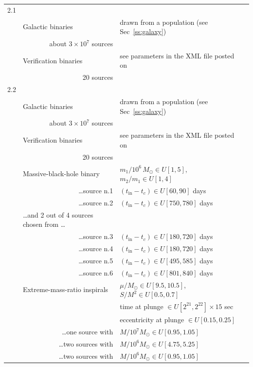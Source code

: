 \documentclass[12pt]{iopart}
\begin{document}
\begin{table}
\begin{tabular}{llll}
2.1 & & \\
&Galactic binaries & drawn from a population (see Sec~\ref{ss:galaxy})\\
&\multicolumn{1}{r}{about $3\times 10^7$ sources} & \\
&Verification binaries & see parameters in the XML file posted on~\cite{MLDCweb}\\
&\multicolumn{1}{r}{20 sources} \\
\hline
2.2 & & \\
&Galactic binaries & drawn from a population (see Sec~\ref{ss:galaxy})\\
&\multicolumn{1}{r}{about $3\times 10^7$ sources} \\
&Verification binaries & see parameters in the XML file posted on~\cite{MLDCweb} \\
&\multicolumn{1}{r}{20 sources} & \\
&Massive-black-hole binary & $m_1/10^6\,M_\odot \in U[1,5]$, $m_2/m_1 \in U[1,4]$ \\
&\multicolumn{1}{r}{\ldots source n.1} &  $(t_\mathrm{in} - t_c) \in U[60,90]$ days \\
&\multicolumn{1}{r}{\ldots source n.2} &  $(t_\mathrm{in} - t_c) \in U[750,780]$ days \\
&\ldots and 2 out of 4 sources chosen from \ldots & \\
&\multicolumn{1}{r}{\ldots source n.3} & $(t_\mathrm{in} - t_c) \in U[180,720]$ days \\
&\multicolumn{1}{r}{\ldots source n.4} &  $(t_\mathrm{in} - t_c) \in U[180,720]$ days\\
&\multicolumn{1}{r}{\ldots source n.5} &  $(t_\mathrm{in} - t_c) \in U[495,585]$ days\\
&\multicolumn{1}{r}{\ldots source n.6} &  $(t_\mathrm{in} - t_c) \in U[801,840]$ days\\
&Extreme-mass-ratio inspirals & $\mu/M_\odot \in U[9.5,10.5]$, $S/M^2 \in U[0.5, 0.7]$ \\
&                                             & time at plunge $\in  U[2^{21},2^{22}] \times 15$ sec \\
&                                             & eccentricity at plunge $\in U[0.15, 0.25]$ \\
&\multicolumn{1}{r}{\ldots one source with}          & $M / 10^7 M_\odot \in U[0.95,1.05]$ \\
&\multicolumn{1}{r}{\ldots two sources with}         & $M / 10^6 M_\odot \in U[4.75,5.25]$ \\
&\multicolumn{1}{r}{\ldots two sources with}         & $M / 10^6 M_\odot \in U[0.95,1.05]$ \\

\end{tabular}
\end{table}
\end{document}
